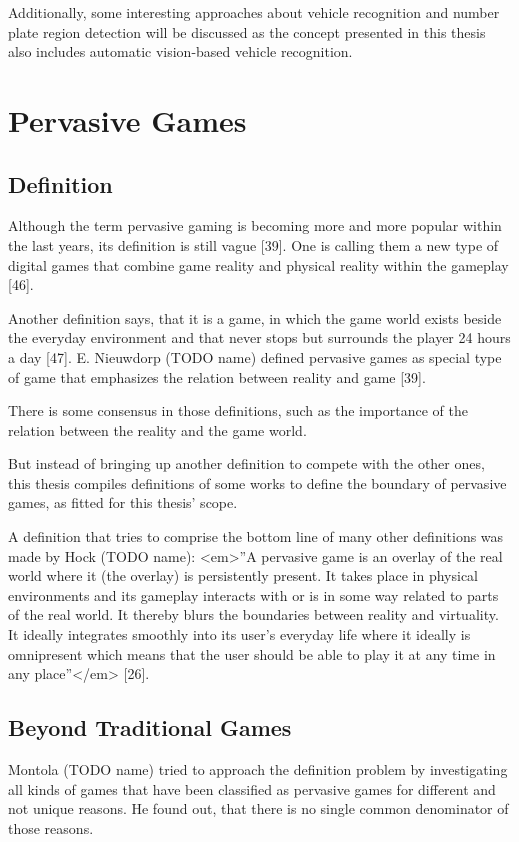 Additionally, some interesting approaches about vehicle recognition and number plate region detection will be discussed as the concept presented in this thesis also includes automatic vision-based vehicle recognition.

\section{Pervasive Games}
\subsection{Definition}
Although the term pervasive gaming is becoming more and more popular within the last years, its definition is still vague [39]. One is calling them a new type of digital games that combine game reality and physical reality within the gameplay [46].

Another definition says, that it is a game, in which the game world exists beside the everyday environment and that never stops but surrounds the player 24 hours a day [47].
E. Nieuwdorp (TODO name) defined pervasive games as special type of game that emphasizes the relation between reality and game [39].

There is some consensus in those definitions, such as the importance of the relation between the reality and the game world.

But instead of bringing up another definition to compete with the other ones, this thesis compiles definitions of some works to define the boundary of pervasive games, as fitted for this thesis’ scope.

A definition that tries to comprise the bottom line of many other definitions was made by Hock (TODO name): <em>”A pervasive game is an overlay of the real world where it (the overlay) is persistently present. It takes place in physical environments and its gameplay interacts with or is in some way related to parts of the real world. It thereby blurs the boundaries between reality and virtuality. It ideally integrates smoothly into its user’s everyday life where it ideally is omnipresent which means that the user should be able to play it at any time in any place”</em> [26].


\subsection{Beyond Traditional Games}
Montola (TODO name) tried to approach the definition problem by investigating all kinds of games that have been classified as pervasive games for different and not unique reasons. He found out, that there is no single common denominator of those reasons.

